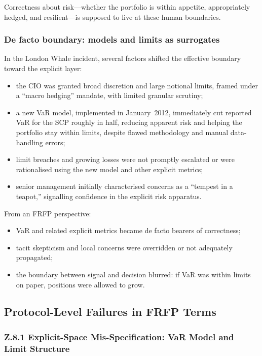 Correctness about risk---whether the portfolio is within appetite,
appropriately hedged, and resilient---is supposed to live at these human
boundaries.

\subsubsection*{De facto boundary: models and limits as surrogates}

In the London Whale incident, several factors shifted the effective boundary
toward the explicit layer:

\begin{itemize}
  \item the CIO was granted broad discretion and large notional limits,
        framed under a ``macro hedging'' mandate, with limited granular
        scrutiny;
  \item a new VaR model, implemented in January~2012, immediately cut
        reported VaR for the SCP roughly in half, reducing apparent risk and
        helping the portfolio stay within limits, despite flawed methodology
        and manual data-handling errors;
  \item limit breaches and growing losses were not promptly escalated or
        were rationalised using the new model and other explicit metrics;
  \item senior management initially characterised concerns as a ``tempest in
        a teapot,'' signalling confidence in the explicit risk apparatus.
\end{itemize}

From an FRFP perspective:

\begin{itemize}
  \item VaR and related explicit metrics became de facto bearers of
        correctness;
  \item tacit skepticism and local concerns were overridden or not adequately
        propagated;
  \item the boundary between signal and decision blurred:
        if VaR was within limits on paper, positions were allowed to grow.
\end{itemize}

\subsection{Protocol-Level Failures in FRFP Terms}

\subsubsection*{Z.8.1 Explicit-Space Mis-Specification:
  VaR Model and Limit Structure}

